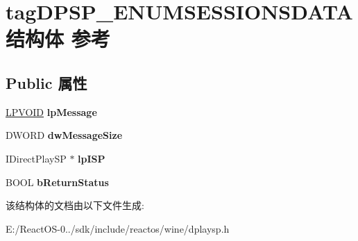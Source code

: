 \hypertarget{structtag_d_p_s_p___e_n_u_m_s_e_s_s_i_o_n_s_d_a_t_a}{}\section{tag\+D\+P\+S\+P\+\_\+\+E\+N\+U\+M\+S\+E\+S\+S\+I\+O\+N\+S\+D\+A\+T\+A结构体 参考}
\label{structtag_d_p_s_p___e_n_u_m_s_e_s_s_i_o_n_s_d_a_t_a}
\subsection*{Public 属性}
\begin{DoxyCompactItemize}
\item 
\mbox{\label{structtag_d_p_s_p___e_n_u_m_s_e_s_s_i_o_n_s_d_a_t_a_a77d3a56ecad7560b1a80c1d22b5bfed8}} 
\hyperlink{interfacevoid}{L\+P\+V\+O\+ID} {\bfseries lp\+Message}
\item 
\mbox{\label{structtag_d_p_s_p___e_n_u_m_s_e_s_s_i_o_n_s_d_a_t_a_ae0c2f5bd05d2ac07624ffde2a1e8d02f}} 
D\+W\+O\+RD {\bfseries dw\+Message\+Size}
\item 
\mbox{\label{structtag_d_p_s_p___e_n_u_m_s_e_s_s_i_o_n_s_d_a_t_a_afdb39f6eab22589dd16cf65d5492a6cb}} 
I\+Direct\+Play\+SP $\ast$ {\bfseries lp\+I\+SP}
\item 
\mbox{\label{structtag_d_p_s_p___e_n_u_m_s_e_s_s_i_o_n_s_d_a_t_a_a2d81698b84f8db30d0011b72ef159066}} 
B\+O\+OL {\bfseries b\+Return\+Status}
\end{DoxyCompactItemize}


该结构体的文档由以下文件生成\+:\begin{DoxyCompactItemize}
\item 
E\+:/\+React\+O\+S-\/0../sdk/include/reactos/wine/dplaysp.\+h\end{DoxyCompactItemize}
